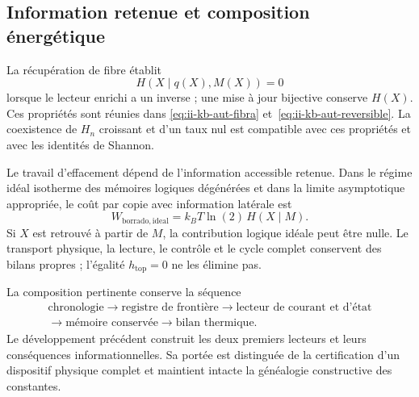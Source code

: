 \subsection{Information retenue et composition énergétique}
\label{md:cron:informacion-energia}

La récupération de fibre établit
\begin{equation}
 H(X\mid q(X),M(X))=0
 \label{md:cron:inversa-enriquecida}
\end{equation}
lorsque le lecteur enrichi a un inverse ; une mise à jour bijective
conserve $H(X)$. Ces propriétés sont réunies dans
\eqref{eq:ii-kb-aut-fibra} et~\eqref{eq:ii-kb-aut-reversible}.
La coexistence de $H_n$ croissant et d’un taux nul est compatible avec ces
propriétés et avec les identités de Shannon.

Le travail d’effacement dépend de l’information accessible retenue.
Dans le régime idéal isotherme des mémoires logiques dégénérées et dans la
limite asymptotique appropriée, le coût par copie avec information latérale est
\begin{equation}
 W_{\mathrm{borrado,ideal}}
 =k_BT\ln(2)\,H(X\mid M).
 \label{md:cron:borrado}
\end{equation}
Si $X$ est retrouvé à partir de $M$, la contribution logique idéale peut être nulle.
Le transport physique, la lecture, le contrôle et le cycle complet conservent
des bilans propres ; l’égalité $h_{\mathrm{top}}=0$ ne les élimine pas.

La composition pertinente conserve la séquence
\[
 \begin{gathered}
 \text{chronologie}\longrightarrow
 \text{registre de frontière}\longrightarrow
 \text{lecteur de courant et d’état}\\
 \longrightarrow
 \text{mémoire conservée}\longrightarrow
 \text{bilan thermique}.
 \end{gathered}
\]
Le développement précédent construit les deux premiers lecteurs et leurs
conséquences informationnelles. Sa portée est distinguée de la certification
d’un dispositif physique complet et maintient intacte la généalogie
constructive des constantes.
